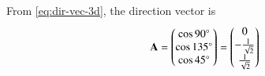 		From \eqref{eq:dir-vec-3d},
the direction vector is
\begin{align}
\mathbf{A}=\begin{pmatrix}\cos 90\degree\\ \cos 135\degree\\ \cos 45\degree\end{pmatrix}=\begin{pmatrix}0\\-\frac{1}{\sqrt{2}}\\ \frac{1}{\sqrt{2}}\end{pmatrix}
\end{align}
